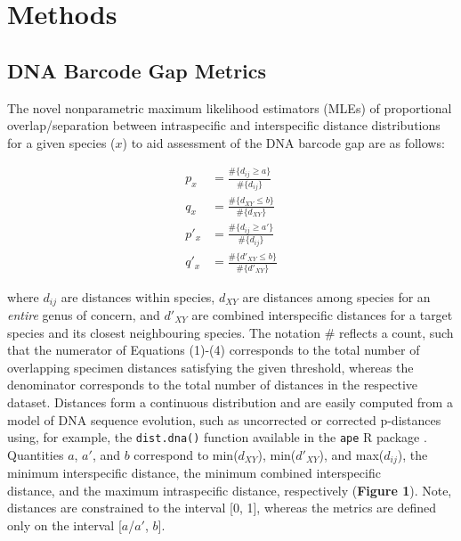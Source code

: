 \documentclass[12pt]{article}
\begin{document}
\section{Methods}

\subsection{DNA Barcode Gap Metrics}

The novel nonparametric maximum likelihood estimators (MLEs) of proportional \\ overlap/separation between intraspecific and interspecific distance distributions for a given species ($x$) to aid assessment of the DNA barcode gap are as follows:

\begin{align}
p_x &= \frac{\#\{d_{ij} \geq a\}}{\#\{d_{ij}\}} \\[1mm]
q_x &= \frac{\#\{d_{XY} \leq b\}}{\#\{d_{XY}\}} \\[1mm]
p'_x &= \frac{\#\{d_{ij} \geq a'\}}{\#\{d_{ij}\}} \\[1mm]
q'_x &= \frac{\#\{d'_{XY} \leq b\}}{\#\{d'_{XY}\}}
\end{align}

\noindent where $d_{ij}$ are distances within species, $d_{XY}$ are distances among species for an \textit{entire} genus of concern, and $d'_{XY}$ are combined interspecific distances for a target species and its closest neighbouring species. The notation \# reflects a count, such that the numerator of Equations (1)-(4) corresponds to the total number of overlapping specimen distances satisfying the given threshold, whereas the denominator corresponds to the total number of distances in the respective dataset. Distances form a continuous distribution and are easily computed from a model of DNA sequence evolution, such as uncorrected or corrected p-distances \citep{jukes1969evolution, kimura1980simple} using, for example, the {\tt dist.dna()} function available in the {\tt ape} R package \citep{paradis2004ape}. Quantities $a$, $a'$, and $b$ correspond to min($d_{XY}$), min($d'_{XY}$), and max($d_{ij}$), the minimum interspecific distance, the minimum combined interspecific \\ distance, and the maximum intraspecific distance, respectively (\textbf{Figure 1}). Note, distances are constrained to the interval [0, 1], whereas the metrics are defined only on the interval [$a$/$a'$, $b$]. 
\end{document}
